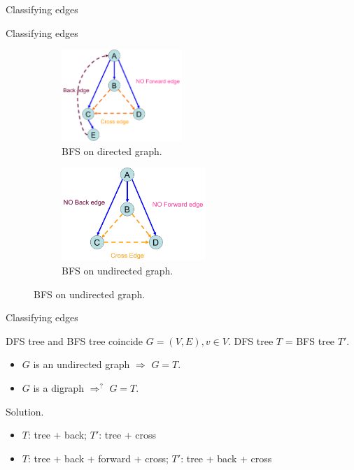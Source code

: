 \begin{frame}{Classifying edges}
\begin{exampleblock}{Classifying edges }
\begin{figure}
      \begin{subfigure}{0.50\linewidth}
	\centering
	\includegraphics[width=0.50\textwidth]{figures/bfs-digraph.png}
	\caption{BFS on directed graph.}
      \end{subfigure}%
      \begin{subfigure}{0.50\linewidth}
	\centering
	\includegraphics[width=0.60\textwidth]{figures/bfs-undirected.png}
	\caption{BFS on undirected graph.}
      \end{subfigure}
    \end{figure}
  \end{exampleblock}
\end{frame}
\begin{frame}{Classifying edges}
  \begin{exampleblock}{DFS tree and BFS tree coincide }
    $G = (V,E), v \in V$. DFS tree $T$ = BFS tree $T'$.

    \begin{itemize}
      \item $G$ is an undirected graph $\Rightarrow$ $G = T$.
      \item $G$ is a digraph $\Rightarrow^{?}$ $G = T$.
    \end{itemize}
  \end{exampleblock}

  \begin{block}{Solution.}
    \begin{itemize}
      \item $T$: tree + back; $T'$: tree + cross
      \item $T$: tree + back + forward + cross; $T'$: tree + back + cross 
    \end{itemize}
  \end{block}
\end{frame}
